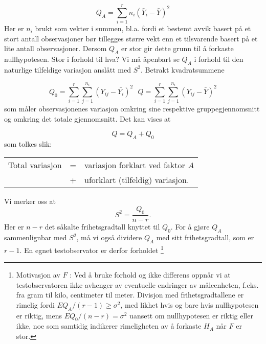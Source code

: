 \[     Q_A=\sum_{i=1}^{r}n_i{(\bar{Y}_i-\bar{Y})}^2 \]
Her er $n_i$ brukt som vekter i summen, bl.a. fordi et bestemt avvik
basert på et stort antall observasjoner bør tillegges større
vekt enn et tilsvarende basert på et lite antall observasjoner.
Dersom $Q_A$ er stor gir dette grunn til å forkaste nullhypotesen.
Stor i forhold til hva? Vi må åpenbart se $Q_A$ i forhold til den
 naturlige tilfeldige variasjon anslått med $S^2$. 
 Betrakt kvadratsummene

\[ Q_0=\sum_{i=1}^{r}\sum_{j=1}^{n_i}{(Y_{ij}-\bar{Y_i})}^2 \mbox{\ \ \ \ }
    Q=\sum_{i=1}^{r}\sum_{j=1}^{n_i}{(Y_{ij}-\bar{Y})}^2 \]
som måler observasjonenes variasjon omkring sine respektive
gruppegjennomsnitt og omkring det totale gjennomsnitt.  Det kan vises at

\[           Q = Q_A + Q_0             \]
som tolkes slik:
\begin{center}
\begin{tabular}{rcl}
Total variasjon & = & variasjon forklart ved faktor $A$  \\
                & + & uforklart (tilfeldig) variasjon.   
\end{tabular}
\end{center}
Vi merker oss at
\[ S^2=\frac{Q_0}{n-r}. \]
Her er $n-r$ det såkalte frihetsgradtall knyttet til $Q_0$.
For å gjøre $Q_A$ sammenlignbar med $S^2$, må vi også
dividere $Q_A$  med sitt frihetsgradtall, som er $r-1$.
En egnet testobservator er derfor forholdet
\footnote{Motivasjon av $F$ : Ved å bruke forhold og ikke
differens oppnår vi at testobservatoren ikke avhenger av eventuelle
endringer av måleenheten, f.eks. fra gram til kilo, centimeter til
meter.  Divisjon med frihetsgradtallene er rimelig fordi 
 $EQ_A/(r-1) \geq {\sigma}^2$, med likhet hvis og bare hvis nullhypotesen
 er riktig, mens $EQ_0/(n-r)= {\sigma}^2$ uansett om nullhypotesen er riktig
 eller ikke, noe som samtidig indikerer rimeligheten av å forkaste $H_A$
når $F$ er stor.}

